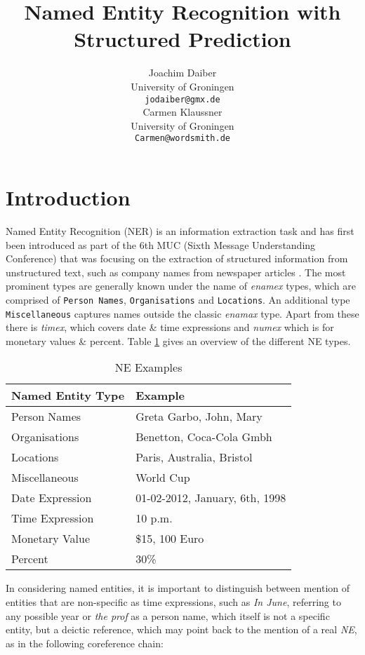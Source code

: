 \documentclass[11pt]{article}
\title{Named Entity Recognition with Structured Prediction}
\author{Joachim Daiber \\
  University of Groningen \\
  {\tt jodaiber@gmx.de} \\\And
  Carmen Klaussner \\
  University of Groningen \\
  {\tt Carmen@wordsmith.de} \\}
\date{}
\begin{document}
\maketitle

\section{Introduction}
Named Entity Recognition (NER) is an information extraction task and has first been introduced as part of the 6th MUC (Sixth Message Understanding Conference)
that was focusing on the extraction of structured information from unstructured text, such as company names from newspaper articles \cite{nadeau2007survey}.
The most prominent types are generally known under the name of \emph{enamex} types, which are comprised of \texttt{Person Names}, \texttt{Organisations} and \texttt{Locations}. 
An additional type \texttt{Miscellaneous} captures names outside the classic \emph{enamax} type.
Apart from these there is \emph{timex}, which covers date \& time expressions and \emph{numex} which is for monetary values \& percent. 
Table \ref{table:NETypes} gives an overview of the different NE types.

\begin{table}[h!]
\scriptsize
\begin{tabular}{| l | l |}
\hline
\bf Named Entity Type & \bf Example \\
\hline
Person Names & Greta Garbo, John, Mary \\
Organisations& Benetton, Coca-Cola Gmbh\\
Locations&  Paris, Australia, Bristol\\
Miscellaneous& World Cup\\
 Date Expression& 01-02-2012, January, 6th, 1998 \\
Time Expression & 10 p.m.\\
Monetary Value &  \$15, 100 Euro   \\
Percent &   30\% \\
\hline
\end{tabular}
\caption{NE Examples}
\label{table:NETypes}
\end{table}


In considering named entities, it is important to distinguish between mention of entities that are non-specific as 
time expressions, such as \emph{In June}, referring to any possible year or \emph{the prof} as a person name, which itself is not a specific entity, 
but a deictic reference, which may point back to the mention of a real \emph{NE}, as in the following coreference chain: \\
\end{document}
